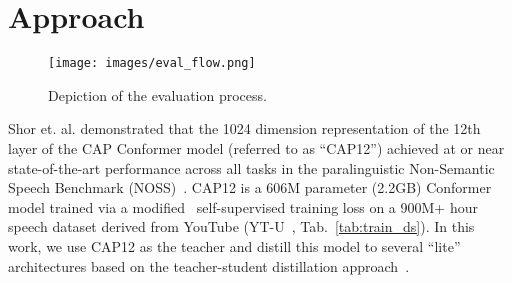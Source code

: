 \section{Approach}
\label{sec:experiments}






\begin{figure}[t]
{\centering
  \texttt{[image: images/eval\_flow.png]}\hspace{0.2cm}
  \caption{Depiction of the evaluation process.}\label{fig:eval_flow}}
  \vspace{-3mm}
\end{figure}



Shor et. al. \cite{cap12} demonstrated that the 1024 dimension representation of the 12th layer of the CAP Conformer model (referred to as ``CAP12'') achieved at or near state-of-the-art performance across all tasks in the paralinguistic Non-Semantic Speech Benchmark (NOSS)~\cite{trill}. CAP12 is a 606M parameter (2.2GB) Conformer model trained via a modified \wavvec\  self-supervised training loss on a 900M+ hour speech dataset derived from YouTube (YT-U~\cite{bigssl}, Tab.~\ref{tab:train_ds}). %
In this work, we use CAP12 as the teacher and distill this model to several ``lite'' architectures based on the teacher-student distillation approach~\cite{distillation}.

